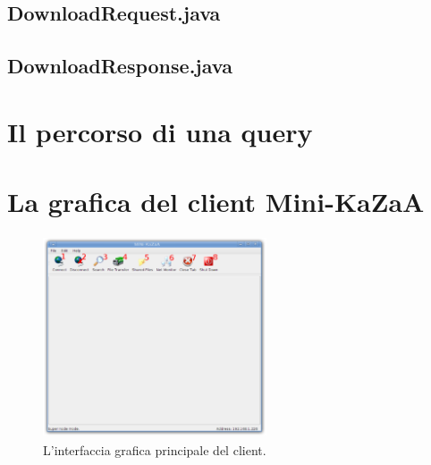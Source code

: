 \subsection{DownloadRequest.java}
\subsection{DownloadResponse.java}

\section{Il percorso di una query}
\section{La grafica del client Mini-KaZaA}
\begin{figure}[t]
 \centering
 \includegraphics[width=250px,height=225px,bb=14 14 841 737]{images/mini_kazaa_client.eps}
 \caption{L'interfaccia grafica principale del client.}
 \label{fig:mini_kazaa_client}
\end{figure}

